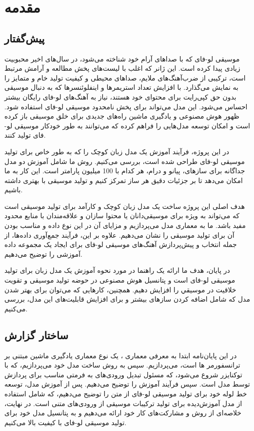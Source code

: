 \chapter{مقدمه}
\section{پیش‌گفتار}
موسیقی لو-فای که با صداهای آرام خود شناخته می‌شود، در سال‌های اخیر محبوبیت زیادی پیدا کرده است. این ژانر که اغلب با لیست‌های پخش مطالعه و آرامش مرتبط است، ترکیبی از ضرب‌آهنگ‌های ملایم، صداهای محیطی و کیفیت تولید خام و متمایز را به نمایش می‌گذارد. با افزایش تعداد استریمرها و اینفلوئنسرها که به دنبال موسیقی بدون حق کپی‌رایت برای محتوای خود هستند، نیاز به آهنگ‌های لو-فای رایگان بیشتر احساس می‌شود. این مدل می‌تواند برای پخش نامحدود موسیقی لو-فای استفاده شود. ظهور هوش مصنوعی  و یادگیری ماشین  راه‌های جدیدی برای خلق موسیقی باز کرده است و امکان توسعه مدل‌هایی را فراهم کرده که می‌توانند به طور خودکار موسیقی لو-فای تولید کنند.

در این پروژه، فرآیند آموزش یک مدل زبان کوچک را که به طور خاص برای تولید موسیقی لو-فای طراحی شده است، بررسی می‌کنیم. روش ما شامل آموزش دو مدل جداگانه برای سازهای، پیانو و درام، هر کدام با 100 میلیون پارامتر است. این کار به ما امکان می‌دهد تا بر جزئیات دقیق هر ساز تمرکز کنیم و تولید موسیقی با بهتری داشته باشیم.

هدف اصلی این پروژه ساخت یک مدل زبان کوچک و کارآمد برای تولید موسیقی است که می‌تواند به ویژه برای موسیقی‌دانان یا محتوا سازان  و علاقه‌مندان با منابع محدود مفید باشد. ما به معماری مدل  می‌پردازیم و مزایای آن در این نوع داده و مناسب بودن آن برای تولید موسیقی را نشان می‌دهیم. علاوه بر این، فرآیند جمع‌آوری داده‌ها، از جمله انتخاب و پیش‌پردازش آهنگ‌های موسیقی لو-فای برای ایجاد یک مجموعه داده آموزشی را توضیح می‌دهیم.

در پایان، هدف ما ارائه یک راهنما در مورد نحوه آموزش یک مدل زبان برای تولید موسیقی لو-فای است و پتانسیل هوش مصنوعی در حوضه تولید موسیقی و تقویت خلاقیت در موسیقي را افزایش دهیم. همچنین، کارهایی که می‌توان برای بهتر شدن مدل که شامل اضافه کردن سازهای بیشتر و  برای افزایش قابلیت‌های این مدل، بررسی می‌کنیم.

\section{ساختار گزارش}

در این پایان‌نامه ابتدا به معرفی معماری ، یک نوع معماری یادگیری ماشین مبتنی بر ترانسفورمر ها است، می‌پردازیم. سپس به روش‌ ساخت مدل خود می‌پردازیم، که با توکنایزر شروع می‌شود، که مسئول تبدیل ورودی‌های  به فرمتی مناسب برای پردازش توسط مدل است. سپس فرآیند آموزش را توضیح می‌دهیم. پس از آموزش مدل، توسعه خط لوله خود برای تولید موسیقی لو-فای از متن را توضیح می‌دهیم، که شامل استفاده از مدل آموزش‌دیده برای تولید ترکیبات موسیقی از ورودی‌های متنی است. در نهایت، خلاصه‌ای از روش و مشارکت‌های کار خود ارائه می‌دهیم و به پتانسیل مدل خود برای تولید موسیقی لو-فای با کیفیت بالا می‌کنیم.